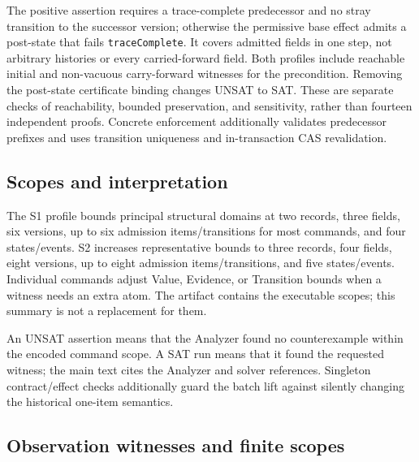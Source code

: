 \documentclass[11pt,a4paper]{article}
\newcommand{\code}[1]{\nolinkurl{#1}}
\begin{document}
The positive assertion requires a trace-complete predecessor and no stray transition to the successor version; otherwise the permissive base effect admits a post-state that fails \code{traceComplete}. It covers admitted fields in one step, not arbitrary histories or every carried-forward field. Both profiles include reachable initial and non-vacuous carry-forward witnesses for the precondition. Removing the post-state certificate binding changes UNSAT to SAT. These are separate checks of reachability, bounded preservation, and sensitivity, rather than fourteen independent proofs. Concrete enforcement additionally validates predecessor prefixes and uses transition uniqueness and in-transaction CAS revalidation.

\subsection{Scopes and interpretation}

The S1 profile bounds principal structural domains at two records, three fields, six versions, up to six admission items/transitions for most commands, and four states/events. S2 increases representative bounds to three records, four fields, eight versions, up to eight admission items/transitions, and five states/events. Individual commands adjust Value, Evidence, or Transition bounds when a witness needs an extra atom. The artifact contains the executable scopes; this summary is not a replacement for them.



An UNSAT assertion means that the Analyzer found no counterexample within the encoded command scope. A SAT run means that it found the requested witness; the main text cites the Analyzer and solver references. Singleton contract/effect checks additionally guard the batch lift against silently changing the historical one-item semantics.


\subsection{Observation witnesses and finite scopes}
\end{document}
